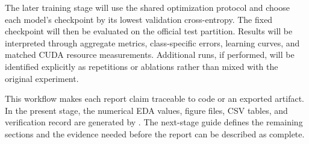 The later training stage will use the shared optimization protocol and choose
each model's checkpoint by its lowest validation cross-entropy. The fixed
checkpoint will then be evaluated on the official test partition. Results
will be interpreted through aggregate metrics, class-specific errors, learning
curves, and matched CUDA resource measurements. Additional runs, if performed,
will be identified explicitly as repetitions or ablations rather than mixed
with the original experiment.

This workflow makes each report claim traceable to code or an exported
artifact. In the present stage, the numerical EDA values, figure files, CSV
tables, and verification record are generated by
. The next-stage guide defines the remaining
sections and the evidence needed before the report can be described as complete.
